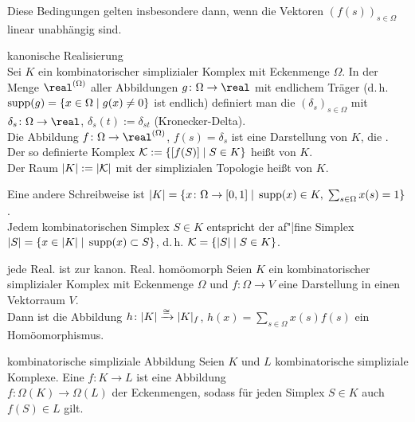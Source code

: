 \begin{Bem}
    Diese Bedingungen gelten insbesondere dann, wenn die Vektoren
    $(f(s))_{s \in \Omega}$ linear unabhängig sind.
\end{Bem}

\begin{Def}{kanonische Realisierung}\\
    Sei $K$ ein kombinatorischer simplizialer Komplex mit
    Eckenmenge $\Omega$.
    In der Menge $\real^{(\Omega)}$ aller Abbildungen
    $g\colon \Omega \rightarrow \real$ mit endlichem Träger
    (d.\,h. $\operatorname{supp}(g) = \{x \in \Omega \;|\; g(x) \not= 0\}$ ist endlich)
    definiert man die 
    $(\delta_s)_{s \in \Omega}$ mit $\delta_s\colon \Omega \rightarrow \real$,
    $\delta_s(t) := \delta_{st}$ (Kronecker-Delta). \\
    Die Abbildung $f\colon \Omega \rightarrow \real^{(\Omega)}$,
    $f(s) = \delta_s$ ist eine Darstellung von $K$, die
    . \\
    Der so definierte Komplex $\mathcal{K} := \{[f(S)] \;|\; S \in K\}$ heißt
     von $K$. \\
    Der Raum $|K| := |\mathcal{K}|$ mit der simplizialen Topologie heißt
     von $K$.
\end{Def}

\begin{Bem}
    Eine andere Schreibweise ist
    $|K| = \{x\colon \Omega \rightarrow [0, 1] \;|\;
    \operatorname{supp}(x) \in K,\; \sum_{s \in \Omega} x(s) = 1\}$. \\
    Jedem kombinatorischen Simplex $S \in K$ entspricht der af"|fine Simplex \\
    $|S| = \{x \in |K| \;|\; \operatorname{supp}(x) \subset S\}$, d.\,h.
    $\mathcal{K} = \{|S| \;|\; S \in K\}$.
\end{Bem}

\begin{Satz}{jede Real. ist zur kanon. Real. homöomorph}
    Seien $K$ ein kombinatorischer simplizialer Komplex mit Eckenmenge $\Omega$
    und $f\colon \Omega \rightarrow V$ eine Darstellung in einen Vektorraum
    $V$. \\
    Dann ist die Abbildung $h\colon |K| \xrightarrow{\cong} |K|_f$,
    $h(x) = \sum_{s \in \Omega} x(s) f(s)$ ein Homöomorphismus.
\end{Satz}

\linie
\pagebreak

\begin{Def}{kombinatorische simpliziale Abbildung}
    Seien $K$ und $L$ kombinatorische simpliziale Komplexe.
    Eine 
    $f\colon K \rightarrow L$ ist eine Abbildung \\
    $f\colon \Omega(K) \rightarrow \Omega(L)$ der Eckenmengen, sodass
    für jeden Simplex $S \in K$ auch $f(S) \in L$ gilt.
\end{Def}

